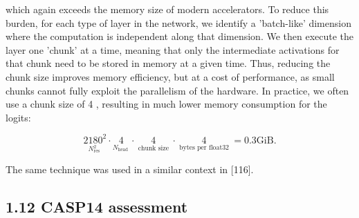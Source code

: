 \documentclass[10pt]{article}
\begin{document}
which again exceeds the memory size of modern accelerators. To reduce this burden, for each type of layer in the network, we identify a 'batch-like' dimension where the computation is independent along that dimension. We then execute the layer one 'chunk' at a time, meaning that only the intermediate activations for that chunk need to be stored in memory at a given time. Thus, reducing the chunk size improves memory efficiency, but at a cost of performance, as small chunks cannot fully exploit the parallelism of the hardware. In practice, we often use a chunk size of 4 , resulting in much lower memory consumption for the logits:


\begin{equation*}
\underset{N_{\text {res }}^{2}}{2180^{2}} \cdot \underset{N_{\text {head }}}{4} \cdot \underset{\text { chunk size }}{4} \cdot \underset{\text { bytes per float32 }}{4}=0.3 \mathrm{GiB} . \tag{52}
\end{equation*}


The same technique was used in a similar context in [116].

\subsection*{1.12 CASP14 assessment}
\end{document}
